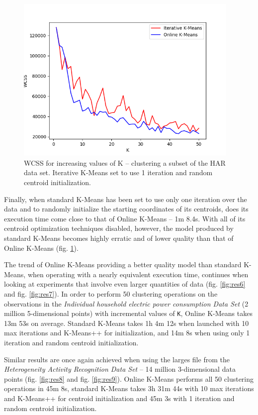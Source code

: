 \documentclass{l4proj}
\begin{document}
\begin{figure}[H]
	\centering
    \includegraphics[width=0.96\textwidth]{images/result5}
    \caption{WCSS for increasing values of K -- clustering a subset of the HAR data set. Iterative K-Means set to use 1 iteration and random centroid initialization. }
    \label{fig:res5}
\end{figure}

Finally, when standard K-Means has been set to use only one iteration over the data  and to randomly initialize the starting coordinates of its centroids, does its execution time come close to that of Online K-Means -- 1m 8.4s. With all of its centroid optimization techniques disabled, however, the model produced by standard K-Means becomes highly erratic and of lower quality than that of Online K-Means (fig. \ref{fig:res5}).

The trend of Online K-Means providing a better quality model than standard K-Means, when operating with a nearly equivalent execution time, continues when looking at experiments that involve even larger quantities of data (fig. \ref{fig:res6} and fig. \ref{fig:res7}). In order to perform 50 clustering operations on the observations in the \textit{Individual household electric power consumption Data Set} (2 million 5-dimensional points) with incremental values of \texttt{K}, Online K-Means takes 13m 53s on average. Standard K-Means takes 1h 4m 12s when launched with 10 max iterations and K-Means++ for initialization,  and 14m 8s when using only 1 iteration and random centroid initialization.

Similar results are once again achieved when using the larges file from the \textit{Heterogeneity Activity Recognition Data Set} -- 14 million 3-dimensional data points (fig. \ref{fig:res8} and fig. \ref{fig:res9}). Online K-Means performs all 50 clustering operations in 45m 8s, standard K-Means takes 3h 31m 44s with 10 max iterations and K-Means++ for centroid initialization and 45m 3s with 1 iteration and random centroid initialization.
\end{document}
